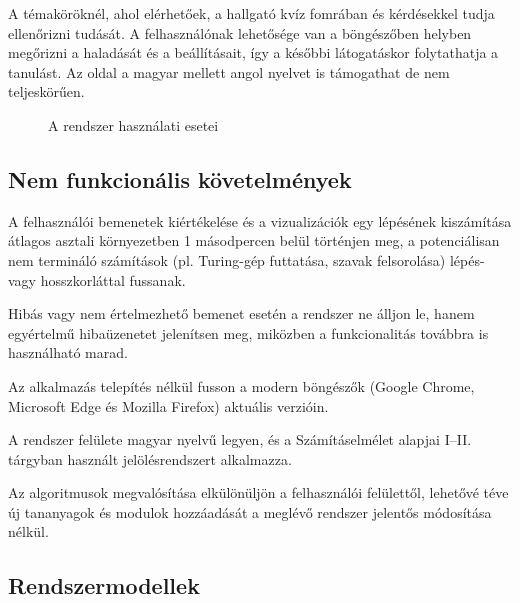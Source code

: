 A témaköröknél, ahol elérhetőek, a hallgató kvíz fomrában és kérdésekkel tudja ellenőrizni tudását.
A felhasználónak lehetősége van a böngészőben helyben megőrizni a haladását és a beállításait, így a későbbi látogatáskor folytathatja a tanulást.
Az oldal a magyar mellett angol nyelvet is támogathat de nem teljeskörűen.

\begin{figure}[H]
    \centering
    \resizebox{\textwidth}{!}{}
    \caption{A rendszer használati esetei}
    \label{fig:usecase}
\end{figure}

\subsection{Nem funkcionális követelmények}

\begin{compactdesc} \item[NFK-1 (Teljesítmény)] A felhasználói bemenetek kiértékelése és a vizualizációk egy lépésének kiszámítása átlagos asztali környezetben 1 másodpercen belül történjen meg, a potenciálisan nem termináló
számítások (pl. Turing-gép futtatása, szavak felsorolása)
lépés- vagy hosszkorláttal fussanak. 
\item[NFK-2 (Megbízhatóság)] 
Hibás vagy nem értelmezhető bemenet esetén a rendszer ne 
álljon le, hanem egyértelmű hibaüzenetet jelenítsen meg, 
miközben a funkcionalitás továbbra is használható marad. 
\item[NFK-3 (Hordozhatóság)] 
Az alkalmazás telepítés nélkül fusson a modern böngészők 
(Google Chrome, Microsoft Edge és Mozilla Firefox) aktuális 
verzióin. 
\item[NFK-4 (Használhatóság)] 
A rendszer felülete magyar nyelvű legyen, és a Számításelmélet
 alapjai I--II. tárgyban használt jelölésrendszert alkalmazza.
  \item[NFK-5 (Karbantarthatóság)]
  Az algoritmusok megvalósítása elkülönüljön a felhasználói
   felülettől, lehetővé téve új tananyagok és modulok 
   hozzáadását a meglévő rendszer jelentős módosítása nélkül. 
\end{compactdesc}


\subsection{Rendszermodellek}


